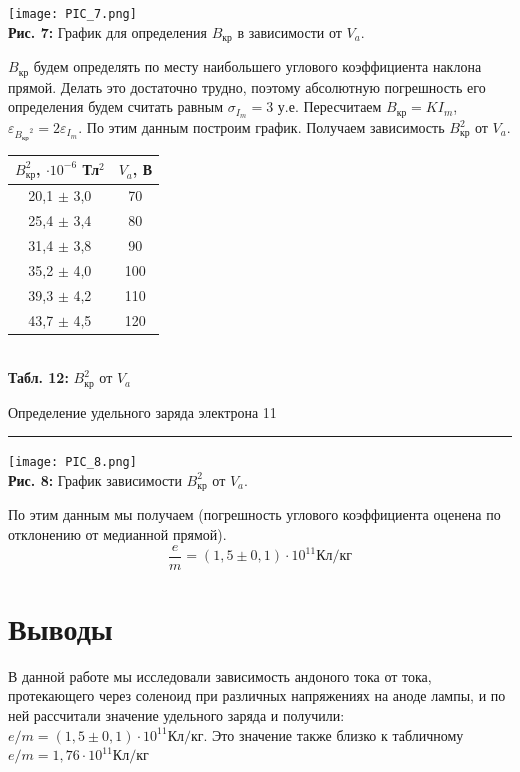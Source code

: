 \documentclass[12pt,a4paper]{scrartcl}
\begin{document}
\begin{center}
\texttt{[image: PIC\_7.png]}\\
\textbf{Рис. 7: } График для определения $B_{\text{кр}}$ в зависимости от $V_a$.
\end{center}

$B_\text{кр}$ будем определять по месту наибольшего углового коэффициента наклона прямой. Делать это достаточно трудно, поэтому абсолютную погрешность его определения будем считать равным $\sigma_{I_m} = 3$ у.е. Пересчитаем $B_\text{кр} = KI_m$, $\varepsilon_{{B_\text{кр}}^2} = 2\varepsilon_{I_m}$. По этим данным построим график. Получаем зависимость $B_{\text{кр}}^2$ от $V_a$.

\begin{center}
\begin{tabular}{|c|c|}
\hline
$B_{\text{кр}}^2$, $\cdot 10^{-6}$ Тл$^2$ & $V_a$, В \\ \hline
20,1 $\pm$ 3,0 & 70 \\ \hline
25,4 $\pm$ 3,4 & 80 \\ \hline
31,4 $\pm$ 3,8 & 90 \\ \hline
35,2 $\pm$ 4,0 & 100 \\ \hline
39,3 $\pm$ 4,2 & 110 \\ \hline
43,7 $\pm$ 4,5 & 120 \\ \hline
\end{tabular}\\
\textbf{Табл. 12:} $B_{\text{кр}}^2$ от $V_a$
\end{center}

		\newpage
	
	\begin{flushleft}
		\footnotesize{Определение удельного заряда электрона} \hspace{\fill} \footnotesize{11}
		\\[-0.3cm]\noindent\rule{\textwidth}{0.3pt}
	\end{flushleft}

\begin{center}
\texttt{[image: PIC\_8.png]}\\
\textbf{Рис. 8:} График зависимости $B_{\text{кр}}^2$ от $V_a$.
\end{center}

 По этим данным мы получаем (погрешность углового коэффициента оценена по отклонению от медианной прямой). 
\[\dfrac{e}{m} = (1,5 \pm 0,1) \cdot 10^{11} \text{Кл}/\text{кг}\]

\section{Выводы}

В данной работе мы исследовали зависимость андоного тока от тока, протекающего через соленоид при различных напряжениях на аноде лампы, и по ней рассчитали значение удельного заряда и получили: $e/m = (1,5 \pm 0,1) \cdot 10^{11} \text{Кл}/\text{кг}$. Это значение также близко к табличному $e/m = 1,76 \cdot 10^{11} \text{Кл}/\text{кг}$
\end{document}
